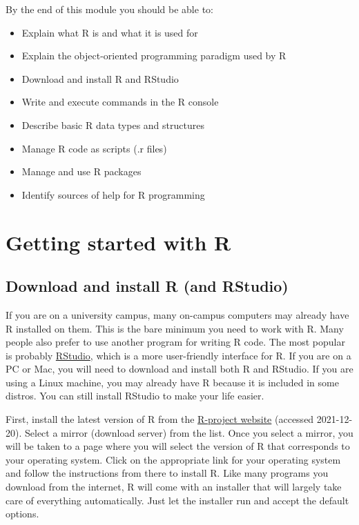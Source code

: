 \documentclass[
  13,
  letterpaper,
]{report}
\providecommand{\tightlist}{%
  \setlength{\itemsep}{0pt}\setlength{\parskip}{0pt}}
\begin{document}
By the end of this module you should be able to:

\begin{itemize}
\tightlist
\item
  Explain what R is and what it is used for
\item
  Explain the object-oriented programming paradigm used by R
\item
  Download and install R and RStudio
\item
  Write and execute commands in the R console
\item
  Describe basic R data types and structures
\item
  Manage R code as scripts (.r files)
\item
  Manage and use R packages
\item
  Identify sources of help for R programming
\end{itemize}

\section{Getting started with R}\label{sec-02-start}

\subsection{Download and install R (and
RStudio)}\label{sec-02-start-install}

If you are on a university campus, many on-campus computers may already
have R installed on them. This is the bare minimum you need to work with
R. Many people also prefer to use another program for writing R code.
The most popular is probably \href{https://posit.co/downloads}{RStudio},
which is a more user-friendly interface for R. If you are on a PC or
Mac, you will need to download and install both R and RStudio. If you
are using a Linux machine, you may already have R because it is included
in some distros. You can still install RStudio to make your life easier.

First, install the latest version of R from the
\href{https://cran.r-project.org/mirrors.html}{R-project website}
(accessed 2021-12-20). Select a mirror (download server) from the list.
Once you select a mirror, you will be taken to a page where you will
select the version of R that corresponds to your operating system. Click
on the appropriate link for your operating system and follow the
instructions from there to install R. Like many programs you download
from the internet, R will come with an installer that will largely take
care of everything automatically. Just let the installer run and accept
the default options.
\end{document}
